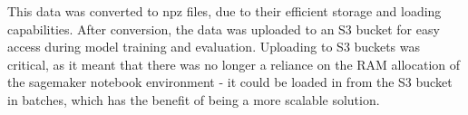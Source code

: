 

This data was converted to npz files, due to their efficient storage and loading capabilities. After conversion, the data was uploaded to an S3 bucket for easy access during model training and evaluation. Uploading to S3 buckets was critical, as it meant that there was no longer a reliance on the RAM allocation of the sagemaker notebook environment - it could be loaded in from the S3 bucket in batches, which has the benefit of being a more scalable solution.
